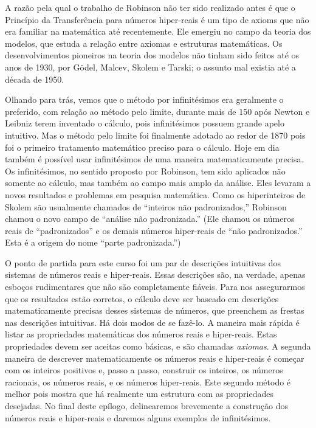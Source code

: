 \documentclass{svmono}
\begin{document}
A razão pela qual o trabalho de Robinson não ter sido realizado antes é
que o Princípio da Transferência para números hiper-reais é um tipo de
axioms que não era familiar na matemática até recentemente. Ele emergiu
no campo da teoria dos modelos, que estuda a relação entre axiomas e
estruturas matemáticas. Os desenvolvimentos pioneiros na teoria dos
modelos não tinham sido feitos até os anos de 1930, por Gödel, Malcev,
Skolem e Tarski; o assunto mal existia até a década de 1950.

Olhando para trás, vemos que o método por infinitésimos era geralmente
o preferido, com relação ao método pelo limite, durante mais de 150 após
Newton e Leibniz terem inventado o cálculo, pois infinitésimos possuem
grande apelo intuitivo. Mas o método pelo limite foi finalmente adotado
ao redor de 1870 pois foi o primeiro tratamento matemático preciso para
o cálculo. Hoje em dia também é possível usar infinitésimos de uma
maneira matematicamente precisa. Os infinitésimos, no sentido proposto
por Robinson, tem sido aplicados não somente ao cálculo, mas também
ao campo mais amplo da análise. Eles levaram a novos resultados e
problemas em pesquisa matemática. Como os hiperinteiros de Skolem são
usualmente chamados de ``inteiros não padronizados,'' Robinson chamou
o novo campo de ``análise não padronizada.'' (Ele chamou os números
reais de ``padronizados'' e os demais números hiper-reais de
``não padronizados.'' Esta é a origem do nome ``parte padronizada.'')

O ponto de partida para este curso foi um par de descrições intuitivas
dos sistemas de números reais e hiper-reais. Essas descrições são,
na verdade, apenas esboços rudimentares que não são completamente
fiáveis. Para nos assegurarmos que os resultados estão corretos, o
cálculo deve ser baseado em descrições matematicamente precisas desses
sistemas de números, que preenchem as frestas nas descrições intuitivas.
Há dois modos de se fazê-lo. A maneira mais rápida é listar as propriedades
matemáticas dos números reais e hiper-reais. Estas propriedades devem ser
aceitas como básicas, e são chamadas \emph{axiomas}. A segunda maneira
de descrever matematicamente os números reais e hiper-reais é começar com
os inteiros positivos e, passo a passo, construir os inteiros, os 
números racionais, os números reais, e os números hiper-reais. Este
segundo método é melhor pois mostra que há realmente um estrutura com as
propriedades desejadas. No final deste epílogo, delinearemos brevemente a
construção dos números reais e hiper-reais e daremos alguns exemplos de
infinitésimos.
\end{document}
